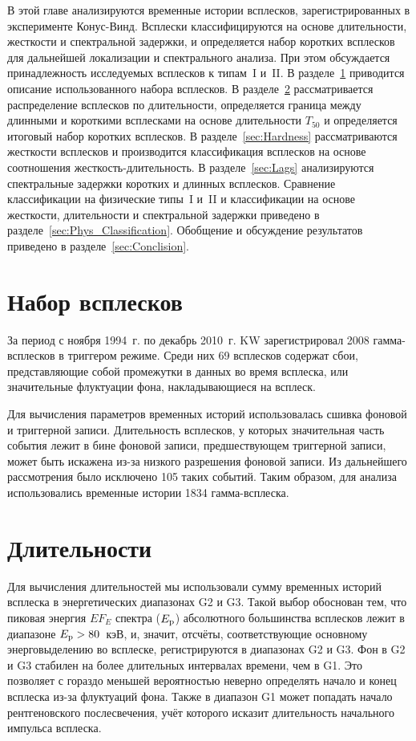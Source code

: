 В этой главе анализируются временные истории всплесков, зарегистрированных в 
эксперименте Конус-Винд. Всплески классифицируются на основе длительности, жесткости и 
спектральной задержки, и определяется набор коротких всплесков для дальнейшей локализации и спектрального анализа. 
При этом обсуждается принадлежность исследуемых всплесков к типам~I и~II. 
В разделе~\ref{sec:GRB_sample} приводится описание использованного набора всплесков. 
В разделе~\ref{sec:Durations} рассматривается распределение всплесков по длительности, 
определяется граница между длинными и короткими всплесками на основе 
длительности $T_{50}$ и определяется итоговый набор коротких всплесков. 
В разделе~\ref{sec:Hardness} рассматриваются жесткости всплесков и производится 
классификация всплесков на основе соотношения жесткость-длительность. 
В разделе~\ref{sec:Lags} анализируются спектральные задержки коротких и длинных всплесков. 
Сравнение классификации на физические типы~I и~II и классификации на основе жесткости, 
длительности и спектральной задержки приведено в разделе~\ref{sec:Phys_Classification}. 
Обобщение и обсуждение результатов приведено в разделе~\ref{sec:Conclision}.  

\section{Набор всплесков}\label{sec:GRB_sample}
За период с ноября 1994~г. по декабрь 2010~г. KW зарегистрировал 2008 гамма-всплесков 
в триггером режиме. Среди них 69 всплесков содержат сбои, представляющие собой 
промежутки в данных во время всплеска, или значительные флуктуации фона, 
накладывающиеся на всплеск. 

Для вычисления параметров временных историй использовалась 
сшивка фоновой и триггерной записи. Длительность всплесков, у которых значительная 
часть события лежит в бине фоновой записи, предшествующем триггерной записи, может быть 
искажена из-за низкого разрешения фоновой записи. Из дальнейшего рассмотрения 
было исключено 105 таких событий. Таким образом, для анализа использовались временные 
истории 1834 гамма-всплеска. 

\section{Длительности}\label{sec:Durations}
Для вычисления длительностей мы использовали сумму временных историй всплеска 
в энергетических диапазонах G2 и G3. Такой выбор обоснован тем, что  пиковая 
энергия $E F_{E}$ спектра ($E_{\mathrm{p}}$) абсолютного большинства всплесков лежит в 
диапазоне $E_{\mathrm{p}}>80$~кэВ, и, значит, отсчёты, соответствующие основному энерговыделению 
во всплеске, регистрируются в диапазонах G2 и G3. Фон в G2 и G3 стабилен на более 
длительных интервалах времени, чем в G1. Это позволяет с гораздо меньшей вероятностью 
неверно определять начало и конец всплеска из-за флуктуаций фона. Также в диапазон G1 
может попадать начало рентгеновского послесвечения, учёт которого исказит 
длительность начального импульса всплеска.

